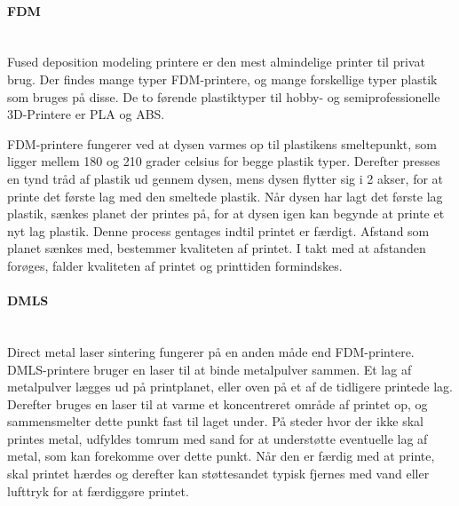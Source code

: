 \paragraph{FDM} \hspace*{\fill} \\ %
Fused deposition modeling printere er den mest almindelige printer til privat brug. Der findes mange typer FDM-printere, og mange forskellige typer plastik som bruges på disse. De to førende plastiktyper til hobby- og semiprofessionelle 3D-Printere er PLA og ABS.\autocite{_3d-guide:_????} 

FDM-printere fungerer ved at dysen varmes op til plastikens smeltepunkt, som ligger mellem 180 og 210 grader celsius for begge plastik typer. Derefter presses en tynd tråd af plastik ud gennem dysen, mens dysen flytter sig i 2 akser, for at printe det første lag med den smeltede plastik. 
Når dysen har lagt det første lag plastik, sænkes planet der printes på, for at dysen igen kan begynde at printe et nyt lag plastik. Denne process gentages indtil printet er færdigt. 
Afstand som planet sænkes med, bestemmer kvaliteten af printet. I takt med at afstanden forøges, falder kvaliteten af printet og printtiden formindskes.


\paragraph{DMLS} \hspace*{\fill} \\%
Direct metal laser sintering fungerer på en anden måde end FDM-printere. DMLS-printere bruger en laser til at binde metalpulver sammen. Et lag af metalpulver lægges ud på printplanet, eller oven på et af de tidligere printede lag. Derefter bruges en laser til at varme et koncentreret område af printet op, og sammensmelter dette punkt fast til laget under. På steder hvor der ikke skal printes metal, udfyldes tomrum med sand for at understøtte eventuelle lag af metal, som kan forekomme over dette punkt.\autocite{manyika_disruptive_2013}
Når den er færdig med at printe, skal printet hærdes og derefter kan støttesandet typisk fjernes med vand eller lufttryk for at færdiggøre printet\autocite{manyika_disruptive_2013}.
\newpage



